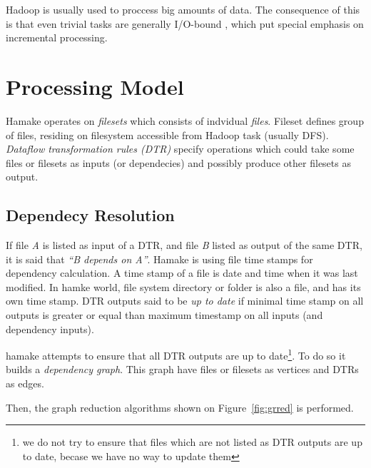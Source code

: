 \documentclass{article}
\begin{document}
Hadoop is usually used to proccess big amounts of data. The
consequence of this is that even trivial tasks are generally I/O-bound
\cite{hadoopattwitter},\cite{hs2010hadoopbench} which put special
emphasis on incremental processing.

\section{Processing Model}

Hamake operates on \textit{filesets} which consists of indvidual
\textit{files}. Fileset defines group of files, residing on filesystem
accessible from Hadoop task (usually DFS). \textit{Dataflow
  transformation rules (DTR)} specify operations which could take some
files or filesets as inputs (or dependecies) and possibly produce
other filesets as output.

\subsection{Dependecy Resolution}

If file \textit{A} is listed as input of a DTR, and file \textit{B}
listed as output of the same DTR, it is said that \textit{``B depends
  on A''}. Hamake is using file time stamps for dependency
calculation. A time stamp of a file is date and time when it was last
modified.  In hamke world, file system directory or folder is also a
file, and has its own time stamp. DTR outputs said to be \textit{up to
  date} if minimal time stamp on all outputs is greater or equal than
maximum timestamp on all inputs (and dependency inputs).

hamake attempts to ensure that all DTR outputs are up to
date\footnote{we do not try to ensure that files which are not listed
  as DTR outputs are up to date, becase we have no way to update
  them}. To do so it builds a \textit{dependency graph}. This graph
have files or filesets as vertices and DTRs as edges.

Then, the graph reduction algorithms shown on Figure~\ref{fig:grred}
is performed.
\end{document}
